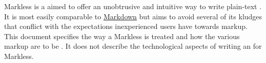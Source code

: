 Markless is a  aimed to offer an unobtrusive and intuitive way to write plain-text . It is most easily comparable to \href{http://daringfireball.net/projects/markdown/}{Markdown} but aims to avoid several of its kludges that conflict with the expectations inexperienced users have towards markup. \\

This document specifies the way a Markless  is treated and how the various markup  are to be . It does not describe the technological aspects of writing an  for Markless.

